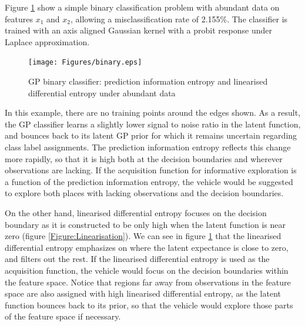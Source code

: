 \documentclass{article}
\begin{document}
		Figure \ref{Figure:Results:BinaryLinearisedEntropy} show a simple binary classification problem with abundant data on features $x_{1}$ and $x_{2}$, allowing a misclassification rate of 2.155\%. The classifier is trained with an axis aligned Gaussian kernel with a probit response under Laplace approximation. 

		\begin{figure}[t]
		\centering
			\texttt{[image: Figures/binary.eps]}
		\caption{GP binary classifier: prediction information entropy and linearised differential entropy under abundant data}
		\label{Figure:Results:BinaryLinearisedEntropy}
		\end{figure}
		
		In this example, there are no training points around the edges shown. As a result, the GP classifier learns a slightly lower signal to noise ratio in the latent function, and bounces back to its latent GP prior for which it remains uncertain regarding class label assignments. The prediction information entropy reflects this change more rapidly, so that it is high both at the decision boundaries and wherever observations are lacking. If the acquisition function for informative exploration is a function of the prediction information entropy, the vehicle would be suggested to explore both places with lacking observations and the decision boundaries. 
		
		On the other hand, linearised differential entropy focuses on the decision boundary as it is constructed to be only high when the latent function is near zero (figure \ref{Figure:Linearisation}). We can see in figure \ref{Figure:Results:BinaryLinearisedEntropy} that the linearised differential entropy emphasizes on where the latent expectance is close to zero, and filters out the rest. If the linearised differential entropy is used as the acquisition function, the vehicle would focus on the decision boundaries within the feature space. Notice that regions far away from observations in the feature space are also assigned with high linearised differential entropy, as the latent function bounces back to its prior, so that the vehicle would explore those parts of the feature space if necessary.
		
		
\end{document}
